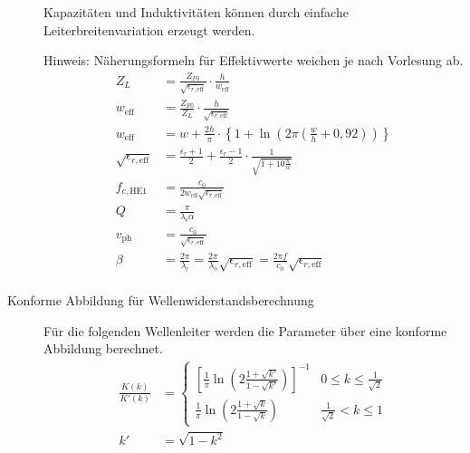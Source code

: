 \begin{description}
\begin{center}
\begin{tikzpicture}[scale=0.2, every node/.style={scale=0.8}]

\end{tikzpicture}
\end{center}
Kapazitäten und Induktivitäten können durch einfache Leiterbreitenvariation erzeugt werden.
\begin{center}
\begin{tikzpicture}[scale=0.2, every node/.style={scale=1}]

\end{tikzpicture}
\end{center}
Hinweis: Näherungsformeln für Effektivwerte weichen je nach Vorlesung ab.
\begin{align*}
Z_L &= \frac{Z_{F0}}{\sqrt{\epsilon_{r,\text{eff}}}} \cdot \frac{h}{w_\text{eff}} \\
w_\text{eff} &= \frac{Z_{F0}}{Z_L} \cdot \frac{h}{\sqrt{\epsilon_{r,\text{eff}}}} \\
w_\text{eff} &= w + \frac{2h}{\pi} \cdot \left\{ 1 + \ln\left(2\pi ( \frac{w}{h} + 0,92) \right) \right\} \\
\sqrt{\epsilon_{r,\text{eff}}} &= \frac{\epsilon_r + 1}{2} + \frac{\epsilon_r - 1}{2} \cdot \frac{1}{\sqrt{1 + 10 \frac{h}{w}}} \\
f_{c,\text{HE1}} &= \frac{c_0}{2w_\text{eff}\sqrt{\epsilon_{r,\text{eff}}}} \\
Q &= \frac{\pi}{\lambda_\epsilon \alpha} \\
v_\text{ph} &= \frac{c_0}{\sqrt{\epsilon_{r,\text{eff}}}} \\
\beta &= \frac{2\pi}{\lambda_\epsilon} = \frac{2\pi}{\lambda_o} \sqrt{\epsilon_{r,\text{eff}}} = \frac{2\pi f}{c_0} \sqrt{\epsilon_{r,\text{eff}}} \\
\end{align*}

\item[Konforme Abbildung für Wellenwiderstandsberechnung] Für die folgenden Wellenleiter werden die Parameter über eine konforme Abbildung berechnet. %
\begin{align*}
\frac{K(k)}{K'(k)} &= \left\{ \begin{matrix}
\left[ \frac{1}{\pi} \ln \left( 2\frac{1+\sqrt{k'}}{1-\sqrt{k'}} \right) \right]^{-1} & 0 \leq k \leq \frac{1}{\sqrt{2}} \\ 
\frac{1}{\pi} \ln \left( 2\frac{1+\sqrt{k}}{1-\sqrt{k}} \right) & \frac{1}{\sqrt{2}} < k \leq 1
\end{matrix}  \right. \\
k' &= \sqrt{1-k^2}
\end{align*}


\end{description}
